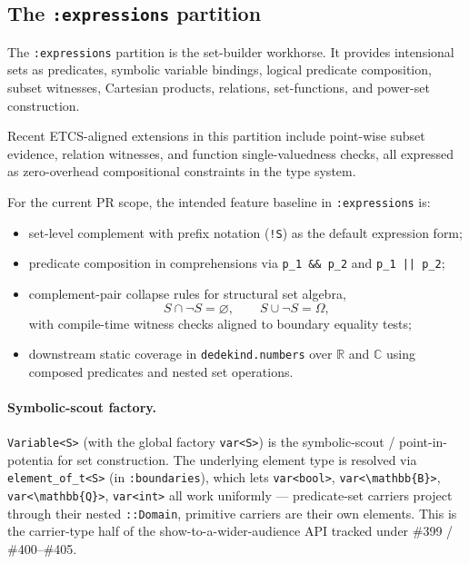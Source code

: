 \documentclass[11pt, a4paper]{report}
\begin{document}
\subsection{The \texttt{:expressions} partition}

The \texttt{:expressions} partition is the set-builder workhorse. It provides intensional sets as predicates, symbolic variable bindings, logical predicate composition, subset witnesses, Cartesian products, relations, set-functions, and power-set construction.

Recent ETCS-aligned extensions in this partition include point-wise subset evidence, relation witnesses, and function single-valuedness checks, all expressed as zero-overhead compositional constraints in the type system.

For the current PR scope, the intended feature baseline in \texttt{:expressions} is:
\begin{itemize}
  \item set-level complement with prefix notation (\texttt{!S}) as the default expression form;
  \item predicate composition in comprehensions via \texttt{p\_1 \&\& p\_2} and \texttt{p\_1 || p\_2};
  \item complement-pair collapse rules for structural set algebra,
  \[
    S \cap \neg S = \varnothing, \qquad S \cup \neg S = \Omega,
  \]
  with compile-time witness checks aligned to boundary equality tests;
  \item downstream static coverage in \texttt{dedekind.numbers} over $\mathbb{R}$ and $\mathbb{C}$ using composed predicates and nested set operations.
\end{itemize}

\paragraph{Symbolic-scout factory.} \texttt{Variable<S>} (with the global factory \texttt{var<S>}) is the symbolic-scout / point-in-potentia for set construction. The underlying element type is resolved via \texttt{element\_of\_t<S>} (in \texttt{:boundaries}), which lets \texttt{var<bool>}, \texttt{var<\textbackslash{}mathbb\{B\}>}, \texttt{var<\textbackslash{}mathbb\{Q\}>}, \texttt{var<int>} all work uniformly --- predicate-set carriers project through their nested \texttt{::Domain}, primitive carriers are their own elements. This is the carrier-type half of the show-to-a-wider-audience API tracked under \#399 / \#400--\#405.
\end{document}
